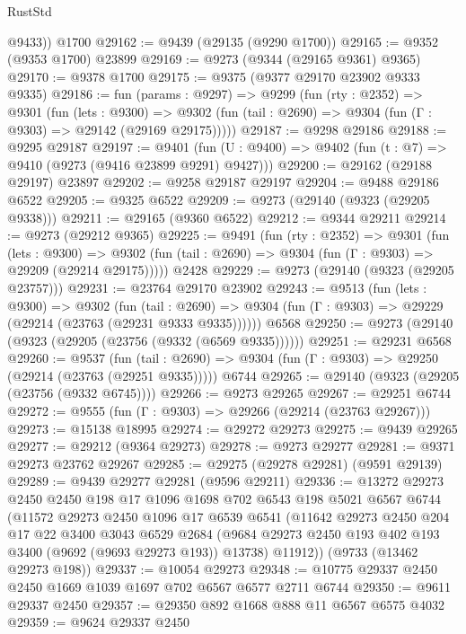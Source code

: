 \begin{lexlean}{RustStd}
\begin{coremodule}
{\begin{coremodule}
{{{{{{{{{{{{{{{{{{{{{{{{{{{{{{{{{{{{{{{{{{{{{{{{{{{{{{{        @9433))
    @1700
@29162 := @9439 (@29135 (@9290 @1700))
@29165 := @9352 (@9353 @1700) @23899
@29169 := @9273 (@9344 (@29165 @9361) @9365)
@29170 := @9378 @1700
@29175 := @9375 (@9377 @29170 @23902 @9333 @9335)
@29186 := fun (params : @9297) =>
  @9299
    (fun (rty : @2352) =>
    @9301
      (fun (lets : @9300) =>
      @9302 (fun (tail : @2690) => @9304 (fun (Γ : @9303) => @29142 (@29169 @29175)))))
@29187 := @9298 @29186
@29188 := @9295 @29187
@29197 := @9401
    (fun (U : @9400) => @9402 (fun (t : @7) => @9410 (@9273 (@9416 @23899 @9291) @9427)))
@29200 := @29162 (@29188 @29197) @23897
@29202 := @9258 @29187 @29197
@29204 := @9488 @29186 @6522
@29205 := @9325 @6522
@29209 := @9273 (@29140 (@9323 (@29205 @9338)))
@29211 := @29165 (@9360 @6522)
@29212 := @9344 @29211
@29214 := @9273 (@29212 @9365)
@29225 := @9491
    (fun (rty : @2352) =>
    @9301
      (fun (lets : @9300) =>
      @9302 (fun (tail : @2690) => @9304 (fun (Γ : @9303) => @29209 (@29214 @29175)))))
    @2428
@29229 := @9273 (@29140 (@9323 (@29205 @23757)))
@29231 := @23764 @29170 @23902
@29243 := @9513
    (fun (lets : @9300) =>
    @9302
      (fun (tail : @2690) =>
      @9304 (fun (Γ : @9303) => @29229 (@29214 (@23763 (@29231 @9333 @9335))))))
    @6568
@29250 := @9273 (@29140 (@9323 (@29205 (@23756 (@9332 (@6569 @9335))))))
@29251 := @29231 @6568
@29260 := @9537
    (fun (tail : @2690) => @9304 (fun (Γ : @9303) => @29250 (@29214 (@23763 (@29251 @9335)))))
    @6744
@29265 := @29140 (@9323 (@29205 (@23756 (@9332 @6745))))
@29266 := @9273 @29265
@29267 := @29251 @6744
@29272 := @9555 (fun (Γ : @9303) => @29266 (@29214 (@23763 @29267)))
@29273 := @15138 @18995
@29274 := @29272 @29273
@29275 := @9439 @29265
@29277 := @29212 (@9364 @29273)
@29278 := @9273 @29277
@29281 := @9371 @29273 @23762 @29267
@29285 := @29275 (@29278 @29281) (@9591 @29139)
@29289 := @9439 @29277 @29281 (@9596 @29211)
@29336 := @13272
    @29273
    @2450
    @2450
    @198
    @17
    @1096
    @1698
    @702
    @6543
    @198
    @5021
    @6567
    @6744
    (@11572
      @29273
      @2450
      @1096
      @17
      @6539
      @6541
      (@11642
        @29273
        @2450
        @204
        @17
        @22
        @3400
        @3043
        @6529
        @2684
        (@9684 @29273 @2450 @193 @402 @193 @3400 (@9692 (@9693 @29273 @193)) @13738)
        @11912))
    (@9733 (@13462 @29273 @198))
@29337 := @10054 @29273
@29348 := @10775 @29337 @2450 @2450 @1669 @1039 @1697 @702 @6567 @6577 @2711 @6744
@29350 := @9611 @29337 @2450
@29357 := @29350 @892 @1668 @888 @11 @6567 @6575 @4032
@29359 := @9624 @29337 @2450
}}}}}}}}}}}}}}}}}}}}}}}}}}}}}}}}}}}}}}}}}}}}}}}}}}}}}}}
\end{coremodule}}
\end{coremodule}
\end{lexlean}
